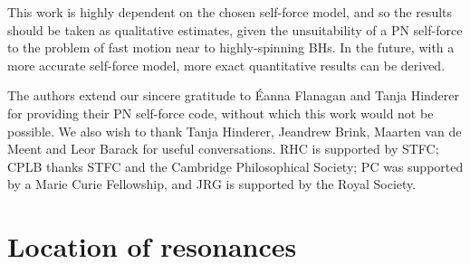 \documentclass[aps,prd,amsfonts,amssymb,amsmath,nofootinbib,showpacs,superscriptaddress,twocolumn]{revtex4}
\begin{document}
This work is highly dependent on the chosen self-force model, and so the results should be taken as qualitative estimates, given the unsuitability of a PN self-force to the problem of fast motion near to highly-spinning BHs. In the future, with a more accurate self-force model, more exact quantitative results can be derived.

\begin{acknowledgments}
The authors extend our sincere gratitude to \'{E}anna Flanagan and Tanja Hinderer for providing their PN self-force code, without which this work would not be possible. We also wish to thank Tanja Hinderer, Jeandrew Brink, Maarten van de Meent and Leor Barack for useful conversations. RHC is supported by STFC; CPLB thanks STFC and the Cambridge Philosophical Society; PC was supported by a Marie Curie Fellowship, and JRG is supported by the Royal Society.
\end{acknowledgments}

\appendix

\section{Location of resonances}\label{sec:location}
\end{document}
